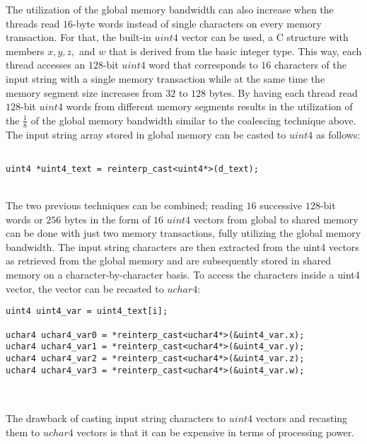 \documentclass{ws-ijait}
\begin{document}
The utilization of the global memory bandwidth can also increase when the threads read $16$-byte words instead of single characters on every memory transaction. For that, the built-in $uint4$ vector can be used, a C structure with members $x, y, z,$ and $w$ that is derived from the basic integer type. This way, each thread accesses an $128$-bit $uint4$ word that corresponds to $16$ characters of the input string with a single memory transaction while at the same time the memory segment size increases from $32$ to $128$ bytes. By having each thread read $128$-bit $uint4$ words from different memory segments results in the utilization of the $\frac{1}{8}$ of the global memory bandwidth similar to the coalescing technique above. The input string array stored in global memory can be casted to $uint4$ as follows:

\noindent\begin{minipage}{\textwidth}
\begin{lstlisting}
	
uint4 *uint4_text = reinterp_cast<uint4*>(d_text);

\end{lstlisting}
\end{minipage}\\

The two previous techniques can be combined; reading $16$ successive $128$-bit words or $256$ bytes in the form of $16$ $uint4$ vectors from global to shared memory can be done with just two memory transactions, fully utilizing the global memory bandwidth. The input string characters are then extracted from the uint4 vectors as retrieved from the global memory and are subsequently stored in shared memory on a character-by-character basis. To access the characters inside a uint4 vector, the vector can be recasted to $uchar4$:

\noindent\begin{minipage}{\textwidth}
\begin{lstlisting}	
uint4 uint4_var = uint4_text[i];

uchar4 uchar4_var0 = *reinterp_cast<uchar4*>(&uint4_var.x);
uchar4 uchar4_var1 = *reinterp_cast<uchar4*>(&uint4_var.y);
uchar4 uchar4_var2 = *reinterp_cast<uchar4*>(&uint4_var.z);
uchar4 uchar4_var3 = *reinterp_cast<uchar4*>(&uint4_var.w);
		
\end{lstlisting}
\end{minipage}\\

The drawback of casting input string characters to $uint4$ vectors and recasting them to $uchar4$ vectors is that it can be expensive in terms of processing power.
\end{document}
